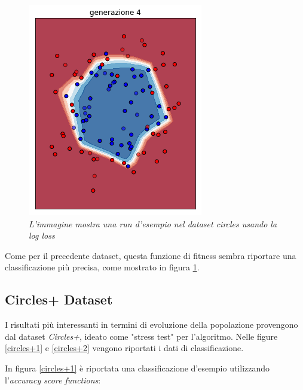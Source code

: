 \documentclass[12pt,a4paper]{report}
\begin{document}
\begin{figure}[H]
 \includegraphics[scale = 0.5]{images/circle-rnd-log/4}
 \caption{\textit{L'immagine mostra una run d'esempio nel dataset circles usando la log loss}}
 \label{circles2}
\end{figure}

Come per il precedente dataset, questa funzione di fitness sembra riportare una classificazione più precisa, come mostrato in figura \ref{circles2}.

\newpage

\subsection{Circles+ Dataset}

I risultati più interessanti in termini di evoluzione della popolazione provengono dal dataset \textit{Circles+}, ideato come "stress test" per l'algoritmo. Nelle figure \ref{circles+1} e \ref{circles+2} vengono riportati i dati di classificazione.

In figura \ref{circles+1} è riportata una classificazione d'esempio utilizzando l'\textit{accuracy score functions}:
\end{document}
